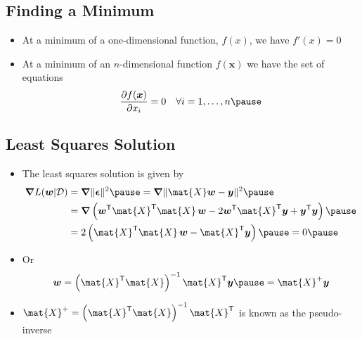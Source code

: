 
\begin{slide}
\section[-2]{Finding a Minimum}

\pb \pause
  \begin{itemize}
  \item At a minimum of a one-dimensional function, $f(x)$, we have
    $f'(x)=0$\pauseh
    \begin{center}
      \pause
    \end{center}
  \item At a minimum of an $n$-dimensional function $f(\bm{x})$
    we have the set of equations
    \begin{align*}
      \frac{\partial f(\bm{x})}{\partial x_i}=0 
      \quad \forall i=1,\ldots, n\pause
    \end{align*}
  \end{itemize}

\end{slide}



\begin{slide}
\section{Least Squares Solution}

\begin{PauseHighLight}

\begin{itemize}\squeeze
\item The least squares solution is given by
  \begin{align*}
    \grad L(\bm{w}|\mathcal{D}) &= \grad \|\bm{\epsilon}\|^2 \pause
                                  = \grad \| \mat{X} \bm{w} - \bm{y}\|^2 \pause \\
    &= \grad \left(\bm{w}^\tr
      \mat{X}^\tr\mat{X} \, \bm{w} -  2 \bm{w}^\tr\mat{X}^\tr \bm{y} +
      \bm{y}^\tr  \bm{y}\right)\pause\\
    &= 2 \left( \mat{X}^\tr\mat{X}\, \bm{w} - \mat{X}^\tr
      \bm{y}\right)\pause = 0 \pause
  \end{align*}
\item Or
  \begin{displaymath}
    \bm{w} = \left(\mat{X}^\tr\mat{X}\right)^{-1} \mat{X}^\tr \bm{y}\pause
    = \mat{X}^{+} \bm{y}
  \end{displaymath}
\item $\mat{X}^{+} = \left(\mat{X}^\tr\mat{X}\right)^{-1} \mat{X}^\tr$ is
  known as the pseudo-inverse\pause
\end{itemize}

\end{PauseHighLight}
\end{slide}


